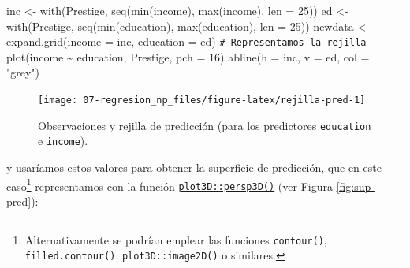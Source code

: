 \documentclass[
]{book}
\newenvironment{Shaded}{\begin{snugshade}}{\end{snugshade}}
\newcommand{\AttributeTok}[1]{\textcolor[rgb]{0.77,0.63,0.00}{#1}}
\newcommand{\CommentTok}[1]{\textcolor[rgb]{0.56,0.35,0.01}{\textit{#1}}}
\newcommand{\DecValTok}[1]{\textcolor[rgb]{0.00,0.00,0.81}{#1}}
\newcommand{\FunctionTok}[1]{\textcolor[rgb]{0.00,0.00,0.00}{#1}}
\newcommand{\NormalTok}[1]{#1}
\newcommand{\OtherTok}[1]{\textcolor[rgb]{0.56,0.35,0.01}{#1}}
\newcommand{\SpecialCharTok}[1]{\textcolor[rgb]{0.00,0.00,0.00}{#1}}
\newcommand{\StringTok}[1]{\textcolor[rgb]{0.31,0.60,0.02}{#1}}
\theoremstyle{break}
\theoremstyle{nonumberplain}
\renewcommand{\CommentTok}[1]{\textcolor[rgb]{0.41,0.41,0.41}{\texttt{#1}}}
\begin{document}
\begin{Shaded}
\begin{Highlighting}[]
\NormalTok{inc }\OtherTok{\textless{}{-}} \FunctionTok{with}\NormalTok{(Prestige, }\FunctionTok{seq}\NormalTok{(}\FunctionTok{min}\NormalTok{(income), }\FunctionTok{max}\NormalTok{(income), }\AttributeTok{len =} \DecValTok{25}\NormalTok{))}
\NormalTok{ed }\OtherTok{\textless{}{-}} \FunctionTok{with}\NormalTok{(Prestige, }\FunctionTok{seq}\NormalTok{(}\FunctionTok{min}\NormalTok{(education), }\FunctionTok{max}\NormalTok{(education), }\AttributeTok{len =} \DecValTok{25}\NormalTok{))}
\NormalTok{newdata }\OtherTok{\textless{}{-}} \FunctionTok{expand.grid}\NormalTok{(}\AttributeTok{income =}\NormalTok{ inc, }\AttributeTok{education =}\NormalTok{ ed)}
\CommentTok{\# Representamos la rejilla}
\FunctionTok{plot}\NormalTok{(income }\SpecialCharTok{\textasciitilde{}}\NormalTok{ education, Prestige, }\AttributeTok{pch =} \DecValTok{16}\NormalTok{)}
\FunctionTok{abline}\NormalTok{(}\AttributeTok{h =}\NormalTok{ inc, }\AttributeTok{v =}\NormalTok{ ed, }\AttributeTok{col =} \StringTok{"grey"}\NormalTok{)}
\end{Highlighting}
\end{Shaded}

\begin{figure}[!htb]

{\centering \texttt{[image: 07-regresion\_np\_files/figure-latex/rejilla-pred-1]} 

}

\caption{Observaciones y rejilla de predicción (para los predictores \texttt{education} e \texttt{income}).}\label{fig:rejilla-pred}
\end{figure}

y usaríamos estos valores para obtener la superficie de predicción, que en este caso\footnote{Alternativamente se podrían emplear las funciones \texttt{contour()}, \texttt{filled.contour()}, \texttt{plot3D::image2D()} o similares.} representamos con la función \href{https://rdrr.io/pkg/plot3D/man/persp3D.html}{\texttt{plot3D::persp3D()}} (ver Figura \ref{fig:sup-pred}):
\end{document}
